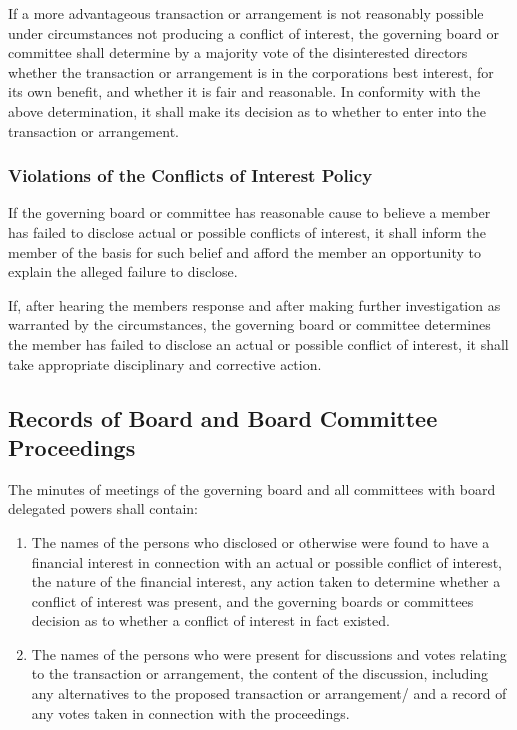 \documentclass{article}
\begin{document}
		If a more advantageous transaction or arrangement is not reasonably possible under circumstances not producing a conflict of interest, the governing board or committee shall determine by a majority vote of the disinterested directors whether the transaction or arrangement is in the corporation\textquotesingle s best interest, for its own benefit, and whether it is fair and reasonable. In conformity with the above determination, it shall make its decision as to whether to enter into the transaction or arrangement.
		
		\subsubsection{Violations of the Conflicts of Interest Policy}
		If the governing board or committee has reasonable cause to believe a member has failed to disclose actual or possible conflicts of interest, it shall inform the member of the basis for such belief and afford the member an opportunity to explain the alleged failure to disclose.
		
		If, after hearing the member\textquotesingle s response and after making further investigation as warranted by the circumstances, the governing board or committee determines the member has failed to disclose an actual or possible conflict of interest, it shall take appropriate disciplinary and corrective action.
	\subsection{Records of Board and Board Committee Proceedings}
	The minutes of meetings of the governing board and all committees with board delegated powers shall contain:
	\begin{enumerate}[\indent (a)] 
		\item The names of the persons who disclosed or otherwise were found to have a financial interest in connection with an actual or possible conflict of interest, the nature of the financial interest, any action taken to determine whether a conflict of interest was present, and the governing board\textquotesingle s or committee\textquotesingle s decision as to whether a conflict of interest in fact existed.
		\item The names of the persons who were present for discussions and votes relating to the transaction or arrangement, the content of the discussion, including any alternatives to the proposed transaction or arrangement/ and a record of any votes taken in connection with the proceedings.
	\end{enumerate}
	
\end{document}
